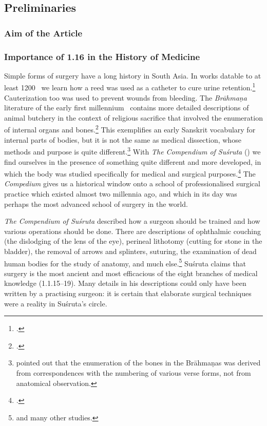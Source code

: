 \subsection{Preliminaries}

\subsubsection{Aim of the Article}

\subsubsection{Importance of 1.16 in the History of Medicine}


Simple forms of surgery have a long history in South Asia. In works datable to at
least 1200 \BC\ we learn how a reed was used as a catheter to cure urine
retention.\footcite[70--71]{zysk-1985} Cauterization too was used to prevent
wounds from bleeding. The \emph{Brāhmaṇa} literature of the early first 
millennium
\BC\ contains more detailed descriptions of animal butchery in the context of
religious sacrifice that involved the enumeration of internal organs and
bones.\footcite{mala-1996}   This exemplifies an early Sanskrit vocabulary for
internal parts of bodies, but it is not the same as medical dissection, whose
methods and purpose is quite different.\footnote{\citet{keit-1908} pointed out
that the enumeration of the bones in the Brāhmaṇas was derived from
correspondences with the numbering of various verse forms, not from anatomical
observation.}  With \emph{The Compendium of Suśruta} (\SS) we find ourselves 
in
the presence of something quite different and more developed, in which the body
was studied specifically for medical and surgical purposes.\footcite{zysk-1986} 
The \emph{Compedium} gives us a historical window onto a school of
professionalised surgical practice which existed almost two millennia ago, and
which in its day was perhaps the most advanced school of surgery in the world.



\emph{The Compendium of 
    Suśruta} described how a surgeon should be trained and
how various operations should be done.  There are descriptions of
ophthalmic couching (the dislodging of the lens of the eye), perineal
lithotomy (cutting for stone in the bladder), the removal of arrows and
splinters, suturing, the examination of dead human bodies for the study of
anatomy, and much 
else.\footnote{\cites{mukh-1913,desh-2000,nara-2011,wuja-2003,wils-1823} and 
many other studies.}  
Suśruta 
claims that surgery is the most ancient
and most efficacious of the eight branches of medical knowledge
(1.1.15--19). Many details in his descriptions could only have been written
by a practising surgeon: it is certain that elaborate surgical techniques
were a reality in Suśruta's circle.

